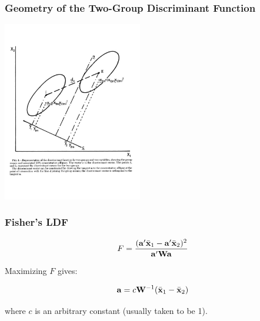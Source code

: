 \documentclass{beamer}
\begin{document}
\begin{frame}
  \frametitle{Geometry of the Two-Group Discriminant Function}

\begin{center}
\includegraphics[height=3.1in]{2group}
\end{center}

\end{frame}

\begin{frame}
  \frametitle{Fisher's LDF}


\[
F = \frac{(\mathbf{a}'\bar{\mathbf{x}}_1 - \mathbf{a}'\bar{\mathbf{x}}_2)^2}{\mathbf{a}'\mathbf{W}\mathbf{a}}
\]


Maximizing $F$ gives:

\[
\mathbf{a} = c\mathbf{W}^{-1}(\bar{\mathbf{x}}_1 - \bar{\mathbf{x}}_2)
\]

where $c$ is an arbitrary constant (usually taken to be 1).

\end{frame}
\end{document}
